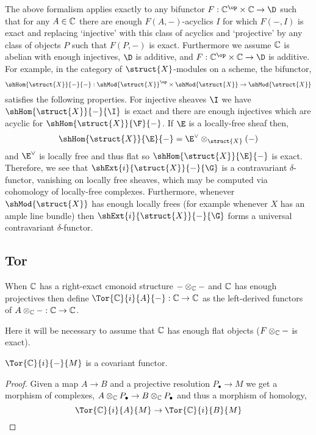 \documentclass[12pt]{article}
\begin{document}
\begin{rmk}
The above formalism applies exactly to any bifunctor $F : \C^\op \times \C \to \D$ such that for any $A \in \mathbb{C}$ there are enough $F(A, -)$-acyclics $I$ for which $F(-,I)$ is exact and replacing `injective' with this class of acyclics and `projective' by any class of objects $P$ such that $F(P, -)$ is exact. Furthermore we assume $\mathbb{C}$ is abelian with enough injectives, $\D$ is additive, and $F : \C^\op \times \C \to \D$ is additive. 
\bigskip\\
For example, in the category of $\struct{X}$-modules on a scheme, the bifunctor,
\[ \shHom{\struct{X}}{-}{-} : \shMod{\struct{X}}^\op \times \shMod{\struct{X}} \to \shMod{\struct{X}} \] satisfies the following properties. For injective sheaves $\I$ we have $\shHom{\struct{X}}{-}{\I}$ is exact and there are enough injectives which are  acyclic for $\shHom{\struct{X}}{\F}{-}$. If $\E$ is a locally-free sheaf then,
\[ \shHom{\struct{X}}{\E}{-} = \E^\vee \otimes_{\struct{X}} (-) \]
and $\E^\vee$ is locally free and thus flat so $\shHom{\struct{X}}{\E}{-}$ is exact. Therefore, we see that $\shExt{i}{\struct{X}}{-}{\G}$ is a contravariant $\delta$-functor, vanishing on locally free sheaves, which may be computed via cohomology of locally-free complexes. Furthermore, whenever $\shMod{\struct{X}}$ has enough locally frees (for example whenever $X$ has an ample line bundle) then $\shExt{i}{\struct{X}}{-}{\G}$ forms a universal contravariant $\delta$-functor.
\end{rmk}

\subsection{Tor}

\begin{defn}
When $\mathbb{C}$ has a right-exact cmonoid structure $- \otimes_{\mathbb{C}} -$ and $\mathbb{C}$ has enough projectives then define $\Tor{\C}{i}{A}{-} : \C \to \C$ as the left-derived functors of $A \otimes_{\mathbb{C}} - : \mathbb{C} \to \mathbb{C}$. 
\end{defn}

\begin{rmk}
Here it will be necessary to assume that $\mathbb{C}$ has enough flat objects ($F \otimes_{\mathbb{C}} -$ is exact). 
\end{rmk}

\begin{lemma}
$\Tor{\C}{i}{-}{M}$ is a covariant functor.
\end{lemma}

\begin{proof}
Given a map $A \to B$ and a projective resolution $P_\bullet \to M$ we get a morphism of complexes, $A \otimes_{\mathbb{C}} P_\bullet \to B \otimes_{\mathbb{C}} P_\bullet$ and thus a morphism of homology,
\[ \Tor{\C}{i}{A}{M} \to \Tor{\C}{i}{B}{M} \]
\end{proof}
\end{document}

